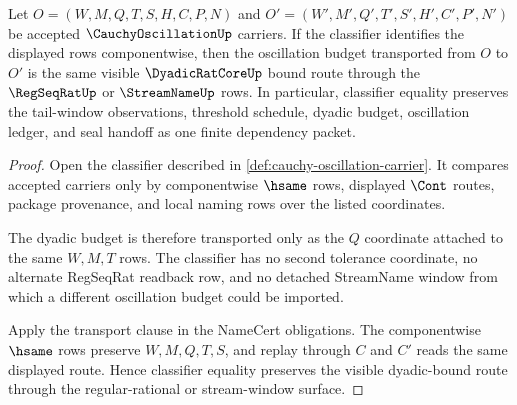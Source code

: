 \begin{theorem}
\label{thm:cauchyoscillation-dyadic-bound-classifier-obligation}
Let $O=(W,M,Q,T,S,H,C,P,N)$ and $O'=(W',M',Q',T',S',H',C',P',N')$ be accepted $\CauchyOscillationUp$ carriers. If the classifier identifies the displayed rows componentwise, then the oscillation budget transported from $O$ to $O'$ is the same visible $\DyadicRatCoreUp$ bound route through the $\RegSeqRatUp$ or $\StreamNameUp$ rows. In particular, classifier equality preserves the tail-window observations, threshold schedule, dyadic budget, oscillation ledger, and seal handoff as one finite dependency packet.
\end{theorem}
\begin{proof}
Open the classifier described in \autoref{def:cauchy-oscillation-carrier}. It compares accepted carriers only by componentwise $\hsame$ rows, displayed $\Cont$ routes, package provenance, and local naming rows over the listed coordinates.

The dyadic budget is therefore transported only as the $Q$ coordinate attached to the same $W,M,T$ rows. The classifier has no second tolerance coordinate, no alternate RegSeqRat readback row, and no detached StreamName window from which a different oscillation budget could be imported.

Apply the transport clause in the NameCert obligations. The componentwise $\hsame$ rows preserve $W,M,Q,T,S$, and replay through $C$ and $C'$ reads the same displayed route. Hence classifier equality preserves the visible dyadic-bound route through the regular-rational or stream-window surface.
\end{proof}

